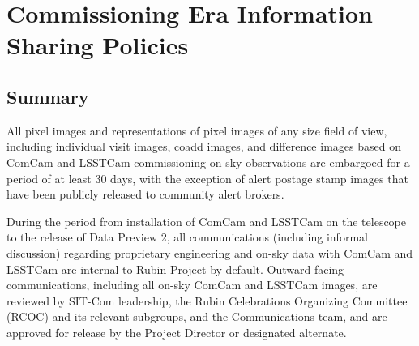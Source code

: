 \documentclass[SE,authoryear,toc,lsstdraft]{lsstdoc}
\begin{document}

\section{Commissioning Era Information Sharing Policies}
\label{policy}

\subsection{Summary}

All pixel images and representations of pixel images of any size field of view, including individual visit images, coadd images, and difference images based on ComCam and LSSTCam commissioning on-sky observations are embargoed for a period of at least 30 days, with the exception of alert postage stamp images that have been publicly released to community alert brokers.

During the period from installation of ComCam and LSSTCam on the telescope to the release of Data Preview 2, all communications (including informal discussion) regarding proprietary engineering and on-sky data with ComCam and LSSTCam are internal to Rubin Project by default.
Outward-facing communications, including all on-sky ComCam and LSSTCam images, are reviewed by SIT-Com leadership, the Rubin Celebrations Organizing Committee (RCOC) and its relevant subgroups, and the Communications team, and are approved for release by the Project Director or designated alternate.
\end{document}
